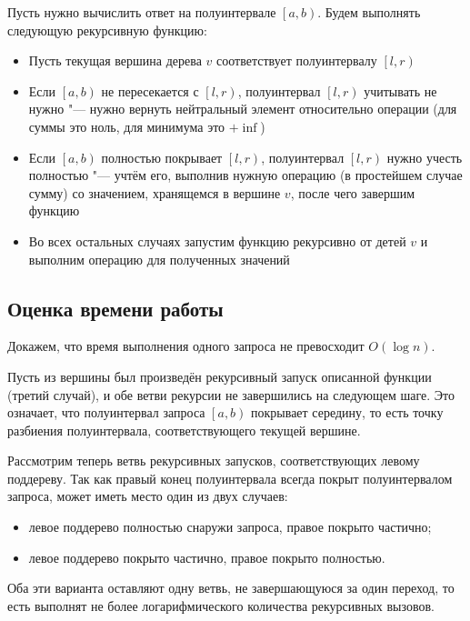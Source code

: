 \documentclass[a4paper,12pt]{article}
\begin{document}
    Пусть нужно вычислить ответ на полуинтервале
    $\left[a, b\right)$. Будем выполнять следующую
    рекурсивную функцию:
    \begin{itemize}
      \item Пусть текущая вершина дерева $v$ соответствует
        полуинтервалу $\left[l, r\right)$
      \item Если $\left[a, b\right)$ не пересекается с
        $\left[l, r\right)$, полуинтервал
        $\left[l, r\right)$ учитывать не нужно "---
        нужно вернуть нейтральный элемент относительно
        операции (для суммы это ноль, для минимума это
        $+\inf$)
      \item Если $\left[a, b\right)$ полностью покрывает
        $\left[l, r\right)$, полуинтервал
        $\left[l, r\right)$ нужно учесть полностью "---
        учтём его, выполнив нужную операцию (в простейшем
        случае сумму) со значением, хранящемся в вершине $v$,
        после чего завершим функцию
      \item Во всех остальных случаях запустим функцию
        рекурсивно от детей $v$ и выполним операцию для
        полученных значений
    \end{itemize}

    \subsection{Оценка времени работы}

    Докажем, что время выполнения одного запроса не
    превосходит $O(\log n)$.

    Пусть из вершины был произведён рекурсивный запуск
    описанной функции (третий случай), и обе ветви рекурсии
    не завершились на следующем шаге. Это означает, что
    полуинтервал запроса $\left[a, b\right)$ покрывает середину,
    то есть точку разбиения полуинтервала, соответствующего
    текущей вершине.

    Рассмотрим теперь ветвь рекурсивных запусков, соответствующих
    левому поддереву. Так как правый конец полуинтервала всегда
    покрыт полуинтервалом запроса, может иметь место один
    из двух случаев:
    \begin{itemize}
      \item левое поддерево полностью снаружи запроса, правое
        покрыто частично;
      \item левое поддерево покрыто частично, правое покрыто
        полностью.
    \end{itemize}
    Оба эти варианта оставляют одну ветвь, не завершающуюся за
    один переход, то есть выполнят не более логарифмического
    количества рекурсивных вызовов.
\end{document}
